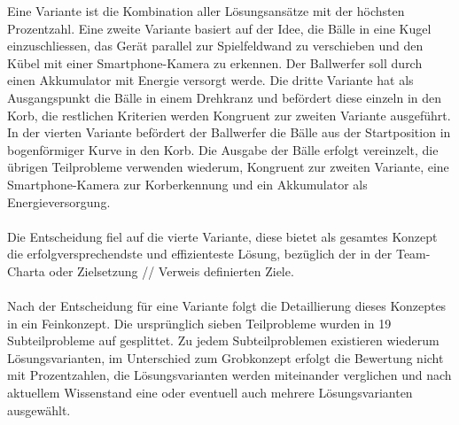 Eine Variante ist die Kombination aller Lösungsansätze mit der höchsten Prozentzahl. Eine zweite Variante basiert auf der Idee, die Bälle in eine Kugel einzuschliessen, das Gerät parallel zur Spielfeldwand zu verschieben und den Kübel mit einer Smartphone-Kamera zu erkennen. Der Ballwerfer soll durch einen Akkumulator mit Energie versorgt werde. Die dritte Variante hat als Ausgangspunkt die Bälle in einem Drehkranz und befördert diese einzeln in den Korb, die restlichen Kriterien werden Kongruent zur zweiten Variante ausgeführt. In der vierten Variante befördert der Ballwerfer die Bälle aus der Startposition in bogenförmiger Kurve in den Korb. Die Ausgabe der Bälle erfolgt vereinzelt, die übrigen Teilprobleme verwenden wiederum, Kongruent zur zweiten Variante, eine Smartphone-Kamera zur Korberkennung und ein Akkumulator als Energieversorgung.\\
\\
Die Entscheidung fiel auf die vierte Variante, diese bietet als gesamtes Konzept die erfolgversprechendste und effizienteste Lösung, bezüglich der in der 
Team-Charta oder Zielsetzung // Verweis definierten Ziele.\\
\\
Nach der Entscheidung für eine Variante folgt die Detaillierung dieses Konzeptes
in ein Feinkonzept. Die ursprünglich sieben Teilprobleme wurden in 19 Subteilprobleme
auf gesplittet. Zu jedem Subteilproblemen existieren wiederum Lösungsvarianten, im Unterschied zum Grobkonzept erfolgt die Bewertung nicht mit Prozentzahlen, die Lösungsvarianten werden miteinander verglichen und nach aktuellem Wissenstand eine oder eventuell auch mehrere Lösungsvarianten ausgewählt. 


